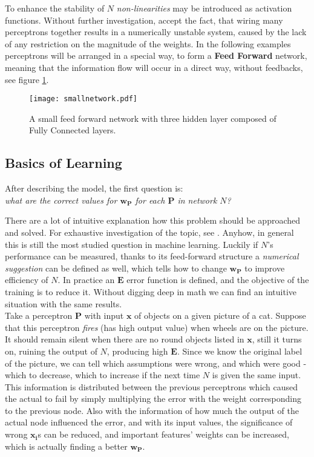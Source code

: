 To enhance the stability of $N$  \emph{non-linearities} may be introduced as activation functions. Without further investigation, accept the fact, that wiring many perceptrons together results in a numerically unstable system, caused by the lack of any restriction on the magnitude of the weights. In the following examples perceptrons will be arranged in a special way, to form a \textbf{Feed Forward} network, meaning that the information flow will occur in a direct way, without feedbacks, see figure \ref{fig:ff}.

\begin{figure}
	\centering
	\texttt{[image: smallnetwork.pdf]}
	\caption{A small feed forward network with three hidden layer composed of Fully Connected layers.
	}
	\label{fig:ff}
\end{figure}

\subsection{Basics of Learning}
After describing the model, the first question is:\\
\emph{what are the correct values for $\mathbf{w_P}$ for each $\mathbf{P}$ in network $N$?}

There are a lot of intuitive explanation how this problem should be approached and solved. For exhaustive investigation of the topic, see \cite{nnsdl}. 
Anyhow, in general this is still the most studied question in machine learning. 
Luckily if $N$'s performance can be measured, thanks to its feed-forward structure a \emph{numerical suggestion} can be defined as well, which tells how to change $\mathbf{w_P}$ to improve efficiency of $N$. In practice an $\mathbf{E}$ error function is defined, and the objective of the training is to reduce it. Without digging deep in math we can find an intuitive situation with the same results.\\

Take a perceptron $\mathbf{P}$ with input $\mathbf{x}$ of objects on a given picture of a cat. Suppose that this perceptron \emph{fires} (has high output value) when wheels are on the picture. It should remain silent when there are no round objects listed in 
$\mathbf{x}$, still it turns on, ruining the output of $N$, producing high $\mathbf{E}$.
Since we know the original label of the picture, we can tell which assumptions were wrong, and which were good - which to decrease, which to increase if the next time $N$ is given the same input. This information is distributed between the previous perceptrons which caused the actual to fail by simply multiplying the error with the weight corresponding to the previous node. Also with the information of how much the output of the actual node influenced the error, and with its input values, the significance of wrong $\mathbf{x_i}$s can be reduced, and important features' weights can be increased, which is actually finding a better $\mathbf{w_P}$.

